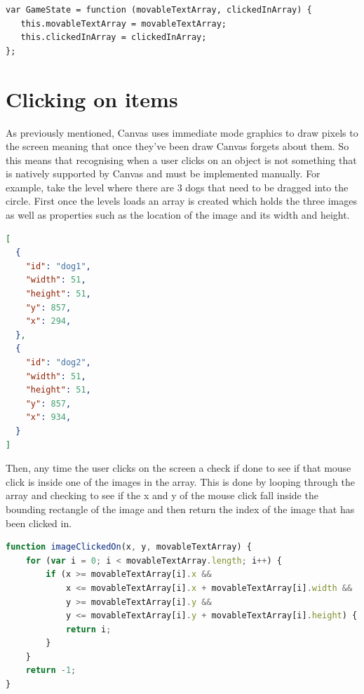 \documentclass[12pt,a4paper]{report}
\begin{document}
\begin{lstlisting}
var GameState = function (movableTextArray, clickedInArray) {
   this.movableTextArray = movableTextArray;
   this.clickedInArray = clickedInArray;
};
\end{lstlisting}


\section{Clicking on items}
As previously mentioned, Canvas uses immediate mode graphics to draw pixels to the screen meaning that once they've been draw Canvas forgets about them. So this means that recognising when a user clicks on an object is not something that is natively supported by Canvas and must be implemented manually. 
For example, take the level where there are 3 dogs that need to be dragged into the circle. First once the levels loads an array is created which holds the three images as well as properties such as the location of the image and its width and height.
\begin{lstlisting}[language=json]
[
  {
    "id": "dog1",
    "width": 51,
    "height": 51,
    "y": 857,
    "x": 294,
  },
  {
    "id": "dog2",
    "width": 51,
    "height": 51,
    "y": 857,
    "x": 934,
  }
]
\end{lstlisting}

Then, any time the user clicks on the screen a check if done to see if that mouse click is inside one of the images in the array.
This is done by looping through the array and checking to see if the x and y of the mouse click fall inside the bounding rectangle of the image and then return the index of the image that has been clicked in.

\begin{lstlisting}[language=JavaScript]
function imageClickedOn(x, y, movableTextArray) {
    for (var i = 0; i < movableTextArray.length; i++) {
        if (x >= movableTextArray[i].x &&
            x <= movableTextArray[i].x + movableTextArray[i].width &&
            y >= movableTextArray[i].y &&
            y <= movableTextArray[i].y + movableTextArray[i].height) {
            return i;
        }
    }
    return -1;
}
\end{lstlisting}
\end{document}
